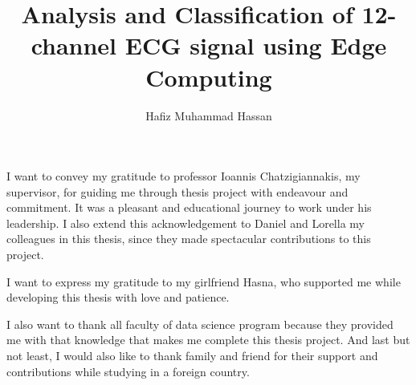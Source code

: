 \documentclass[LaM,binding=0.6cm]{sapthesis}
\title{Analysis and Classification of 12-channel ECG signal using Edge Computing}
\author{Hafiz Muhammad Hassan}
\begin{document}
\frontmatter

\maketitle






\begin{acknowledgments}
\parskip=12pt

I want to convey my gratitude to professor Ioannis Chatzigiannakis, my supervisor, for guiding me through thesis project with endeavour and commitment. It was a pleasant and educational journey to work under his leadership. I also extend this acknowledgement to Daniel and Lorella my colleagues in this thesis, since they made spectacular contributions to this project.

I want to express my gratitude to my girlfriend Hasna, who supported me while developing this thesis with love and patience.

I also want to thank all faculty of data science program because they provided me with that knowledge that makes me complete this thesis project. And last but not least, I would also like to thank family and friend for their support and contributions while studying in a foreign country.



\end{acknowledgments}
\newpage 
\let\cleardoublepage

\tableofcontents

\mainmatter

\parskip=5pt













\backmatter
\cleardoublepage
{}
\end{document}
